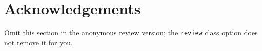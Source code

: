 \documentclass[review]{ml4d}
\begin{document}
\section*{Acknowledgements}
Omit this section in the anonymous review version; the \texttt{review} class
option does not remove it for you.

{}

\end{document}
